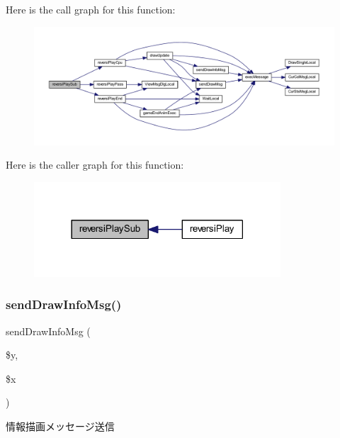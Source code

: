 Here is the call graph for this function\+:
\nopagebreak
\begin{figure}[H]
\begin{center}
\leavevmode
\includegraphics[width=350pt]{class_reversi_play_a990fc6e45b7bdf2dab569f087f8b5a62_cgraph}
\end{center}
\end{figure}
Here is the caller graph for this function\+:
\nopagebreak
\begin{figure}[H]
\begin{center}
\leavevmode
\includegraphics[width=261pt]{class_reversi_play_a990fc6e45b7bdf2dab569f087f8b5a62_icgraph}
\end{center}
\end{figure}
\mbox{\label{class_reversi_play_a829b61937e857a9f1b5b371be25dbabd}} 
\subsubsection{\texorpdfstring{send\+Draw\+Info\+Msg()}{sendDrawInfoMsg()}}
{\footnotesize\ttfamily send\+Draw\+Info\+Msg (\begin{DoxyParamCaption}\item[{}]{\$y,  }\item[{}]{\$x }\end{DoxyParamCaption})}



情報描画メッセージ送信 


